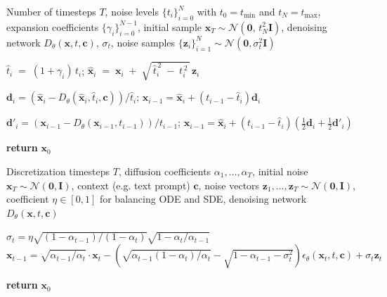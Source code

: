 \documentclass{article}
\newcommand{\x}{\mathbf{x}}
\begin{document}
\begin{algorithm}
\caption{EDM Sampling Algorithm}
\label{alg:edm_sampling}
\begin{algorithmic}[1]
\Require Number of timesteps $T$, noise levels $\{t_i\}_{i=0}^{N}$ with $t_0 = t_{\text{min}}$ and $t_N = t_{\text{max}}$,
         expansion coefficients $\{\gamma_i\}_{i=0}^{N-1}$,
         initial sample $\mathbf{x}_T \sim \mathcal{N}(\mathbf{0},\,t_N^2 \mathbf{I})$,
         denoising network $D_\theta(\mathbf{x}, t,\mathbf{c})$, $\sigma_t$, noise samples $\{\mathbf{z}_i\}_{i=1}^N \sim \mathcal{N}(\mathbf{0}, \sigma_t^2 \mathbf{I})$

    \State $\displaystyle \hat{t}_i \;=\; (1 + \gamma_i)\,t_i$; $\displaystyle \hat{\mathbf{x}}_i \;=\; \mathbf{x}_i \;+\; 
            \sqrt{\,\hat{t}_i^{\,2} \;-\; t_i^{\,2}\,}\,\mathbf{z}_i$
    
    \State $\mathbf{d}_i = \left(\hat{\x}_i-D_\theta(\hat{\x}_i,\hat{t}_i,\mathbf{c})\right)/\hat{t}_i$; ${\x}_{i-1} = \hat{\x}_i + (t_{i-1}-\hat{t}_i)\mathbf{d}_i$

        \State $\mathbf{d}'_i = \left({\x}_{i-1}-D_\theta({\x}_{i-1},t_{i-1})\right)/{t}_{i-1}$; ${\x}_{i-1} = \hat{\x}_i + (t_{i-1}-\hat{t}_i)\left(\frac{1}{2}\mathbf{d}_i+\frac{1}{2}\mathbf{d}'_i\right)$
    \EndIf
\EndFor

\State \textbf{return} $\mathbf{x}_0$
\end{algorithmic}
\end{algorithm}

\begin{algorithm}
\caption{DDIM Sampling Algorithm}
\label{alg:ddim_sampling}
\begin{algorithmic}[1]
\Require Discretization timesteps $T$, diffusion coefficients $\alpha_1, \ldots, \alpha_T$, 
         initial noise $\x_T \sim \mathcal{N}(\mathbf{0},\mathbf{I})$, context (e.g. text prompt) $\mathbf{c}$,
         noise vectors $\mathbf{z}_1, \ldots, \mathbf{z}_T \sim \mathcal{N}(\mathbf{0},\mathbf{I})$,
         coefficient $\eta \in [0,1]$ for balancing ODE and SDE,
         denoising network $D_\theta(\x, t, \mathbf{c})$

\vspace{2mm}

    \State $\sigma_t = \eta \sqrt{(1 - \alpha_{t-1})/(1 - \alpha_{t})}
            \sqrt{1 - \alpha_{t}/\alpha_{t-1}}$
    \State $\x_{t-1} = \sqrt{\alpha_{t-1}/\alpha_t}\cdot \x_t 
            - \left(\sqrt{\alpha_{t-1}(1-\alpha_t)/\alpha_t} - \sqrt{1-\alpha_{t-1}-\sigma_t^2}\right)\epsilon_\theta(\x_t,t,\mathbf{c}) + \sigma_t\mathbf{z}_t$
\EndFor

\State \textbf{return} $\x_0$
\end{algorithmic}
\end{algorithm}
\end{document}
